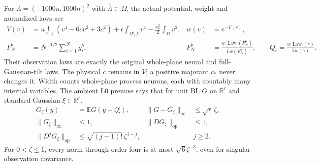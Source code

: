 \documentclass[11pt]{article}
\theoremstyle{plain}
\theoremstyle{definition}
\theoremstyle{remark}
\newcommand{\R}{\mathbb{R}}
\newcommand{\E}{\mathbb{E}}
\DeclareMathOperator{\Law}{Law}
\begin{document}
For $\Lambda=(-1000n,1000n)^2$ with $\overline\Lambda\subset\Omega$, the
actual potential, weight and normalized laws are
\begin{align*}
 V(v)&=u\int_\Lambda(v^4-6cv^2+3c^2)
       +\epsilon\int_{\Omega\setminus\Lambda}v^4
       -\frac{\kappa_a^2}{2}\int_\Omega v^2,&w(v)&=e^{-V(v)},\\
 F_N^b&=N^{-1/2}\sum_{i=1}^N g_i^b,&
 P_N^b&=\frac{w\,\Law(F_N^b)}{\E w(F_N^b)},\qquad
 Q_\epsilon=\frac{w\,\Law(\gamma)}{\E w(\gamma)}.
\end{align*}
Their observation laws are exactly the original whole-plane neural and
full-Gaussian-tilt laws. The physical $c$ remains in $V$; a positive
majorant $c_*$ never changes it. Width counts whole-plane process neurons,
each with countably many internal variables. The ambient L0 premise says
that for unit BL $G$ on $\R^r$ and standard Gaussian $\xi\in\R^r$,
\begin{align*}
 G_\zeta(y)&=\E G(y-\zeta\xi),&
 \|G-G_\zeta\|_\infty&\le\sqrt r\,\zeta,\\
 \|G_\zeta\|_\infty&\le1,&\|DG_\zeta\|_{\mathrm{op}}&\le1,\\
 \|D^jG_\zeta\|_{\mathrm{op}}&\le\sqrt{(j-1)!}\,\zeta^{1-j},&&j\ge2.
\end{align*}
For $0<\zeta\le1$, every norm through order four is at most
$\sqrt6\zeta^{-3}$, even for singular observation covariance.
\end{document}
